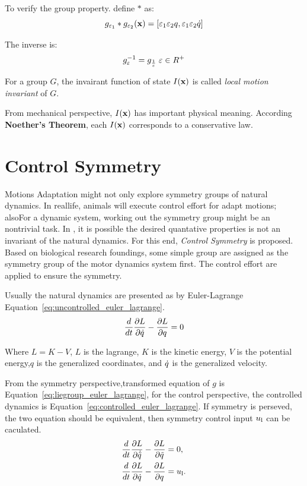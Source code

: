 To verify the group property. define $*$ as:
\[
g_{\varepsilon_1}*g_{\varepsilon_2}(\mathbf{x})=[\varepsilon_1 \varepsilon_2 q, \varepsilon_1 \varepsilon_2 \dot{q}]
\]

The inverse is:
\[
g_{\varepsilon}^{-1}=g_{\frac{1}{\varepsilon}} \;\varepsilon \in R^+
\]

\begin{mydef}
For a group $G$, the invairant function of state $I(\mathbf{x})$ is called \emph{local motion invariant} of $G$. 
\end{mydef}

From mechanical perspective,  $I(\mathbf{x})$ has important physical meaning. 
According  \textbf{Noether's Theorem}, each $I(\mathbf{x})$ corresponds to a conservative law. 


\section{Control Symmetry}
\label{sec:control_symmetry}
Motions Adaptation might not only explore symmetry groups of natural dynamics.
In reallife, animals will execute control effort for adapt motions; alsoFor a dynamic system, working out the symmetry group might be an nontrivial task.
In \cms, it is possible the desired quantative properties is not an invariant of the natural dynamics.
For this end, \emph{Control Symmetry} is proposed.
Based on biological research foundings\citep{flash2007affine}, some simple group are assigned as the symmetry group of the motor dynamics system first.
The control effort are applied to ensure the symmetry.


Usually the natural dynamics are presented as by Euler-Lagrange Equation~\ref{eq:uncontrolled_euler_lagrange}\citep{Goldstein2002}.
\begin{equation}
\frac{d}{dt} \frac{\partial L}{\partial \dot{q}} - \frac{\partial L}{\partial q} = 0
\label{eq:uncontrolled_euler_lagrange}
\end{equation}

Where $L=K-V$, $L$ is the lagrange, $K$ is the kinetic energy, $V$ is the potential energy,$q$ is the generalized coordinates, and $\dot{q}$ is the generalized velocity.

From the symmetry perspective,transformed equation of $g$ is Equation~\ref{eq:liegroup_euler_lagrange}, for the control perspective, the controlled dynamics is Equation~\ref{eq:controlled_euler_lagrange}. If symmetry is perseved, the two equation should be equivalent, then symmetry control input $u_{\mathrm{l}}$ can be caculated.
\begin{align}
\frac{d}{dt} \frac{\partial L}{\partial \dot{\tilde{q}}} - \frac{\partial L}{\partial \tilde{q} }&=0,\label{eq:liegroup_euler_lagrange}\\
\frac{d}{dt} \frac{\partial L}{\partial \dot{q}} - \frac{\partial L}{\partial q}&=u_{\mathrm{l}}. \label{eq:controlled_euler_lagrange}
\end{align}





